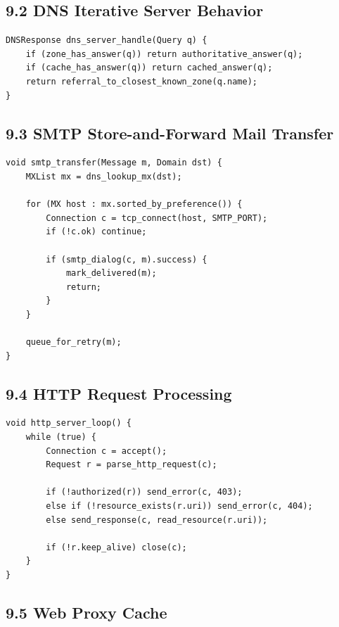 \documentclass[11pt]{article}
\begin{document}
\subsection{9.2 DNS Iterative Server
Behavior}\label{dns-iterative-server-behavior}

\begin{verbatim}
DNSResponse dns_server_handle(Query q) {
    if (zone_has_answer(q)) return authoritative_answer(q);
    if (cache_has_answer(q)) return cached_answer(q);
    return referral_to_closest_known_zone(q.name);
}
\end{verbatim}

\subsection{9.3 SMTP Store-and-Forward Mail
Transfer}\label{smtp-store-and-forward-mail-transfer}

\begin{verbatim}
void smtp_transfer(Message m, Domain dst) {
    MXList mx = dns_lookup_mx(dst);

    for (MX host : mx.sorted_by_preference()) {
        Connection c = tcp_connect(host, SMTP_PORT);
        if (!c.ok) continue;

        if (smtp_dialog(c, m).success) {
            mark_delivered(m);
            return;
        }
    }

    queue_for_retry(m);
}
\end{verbatim}

\subsection{9.4 HTTP Request Processing}\label{http-request-processing}

\begin{verbatim}
void http_server_loop() {
    while (true) {
        Connection c = accept();
        Request r = parse_http_request(c);

        if (!authorized(r)) send_error(c, 403);
        else if (!resource_exists(r.uri)) send_error(c, 404);
        else send_response(c, read_resource(r.uri));

        if (!r.keep_alive) close(c);
    }
}
\end{verbatim}

\subsection{9.5 Web Proxy Cache}\label{web-proxy-cache}
\end{document}
